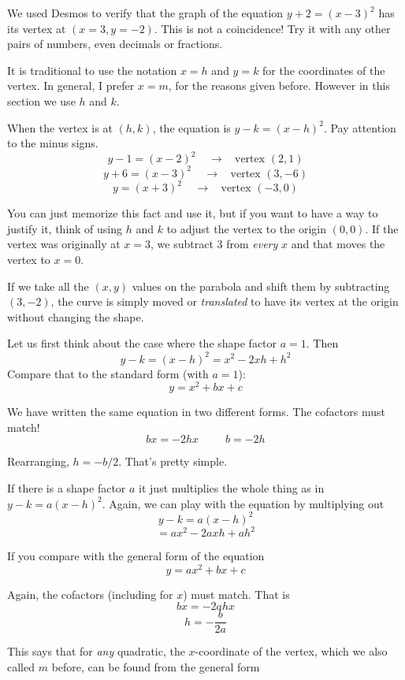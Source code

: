 \documentclass[11pt, oneside]{article}
\begin{document}
We used Desmos to verify that the graph of the equation $y + 2 = (x - 3)^2$ has its vertex at $(x = 3, y = -2)$.  This is not a coincidence!  Try it with any other pairs of numbers, even decimals or fractions.

It is traditional to use the notation $x = h$ and $y = k$ for the coordinates of the vertex.  In general, I prefer $x = m$, for the reasons given before.  However in this section we use $h$ and $k$.

When the vertex is at $(h,k)$, the equation is $y - k = (x - h)^2$.  Pay attention to the minus signs.
\[ y - 1 = (x - 2)^2 \ \ \ \ \ \rightarrow \ \ \ \ \text{vertex } (2,1) \]
\[ y + 6 = (x - 3)^2 \ \ \ \ \ \rightarrow \ \ \ \ \text{vertex } (3,-6) \]
\[ y = (x + 3)^2 \ \ \ \ \ \rightarrow \ \ \ \ \text{vertex } (-3,0) \]

You can just memorize this fact and use it, but if you want to have a way to justify it, think of using $h$ and $k$ to adjust the vertex to the origin $(0,0)$.  If the vertex was originally at $x = 3$, we subtract $3$ from \emph{every} $x$ and that moves the vertex to $x = 0$.

If we take all the $(x,y)$ values on the parabola and shift them by subtracting $(3,-2)$, the curve is simply moved or \emph{translated} to have its vertex at the origin without changing the shape.

Let us first think about the case where the shape factor $a = 1$.  Then
\[ y - k = (x - h)^2 = x^2 - 2xh + h^2 \]
Compare that to the standard form (with $a=1$):
\[ y = x^2 + bx + c \]

We have written the same equation in two different forms.  The cofactors must match!
\[ bx = - 2hx  \ \ \ \ \ \  \ \ \ \ \  b = - 2h \]

Rearranging, $h = -b/2$.  That's pretty simple.

If there is a shape factor $a$ it just multiplies the whole thing as in $y - k = a(x - h)^2$.  Again, we can play with the equation by multiplying out
\[ y - k = a(x - h)^2 \]
\[ = ax^2 - 2axh + ah^2 \]

If you compare with the general form of the equation
\[ y = ax^2 + bx + c \]

Again, the cofactors (including for $x$) must match.  That is
\[ bx = - 2ahx \]
\[ h = - \frac{b}{2a} \]

This says that for \emph{any} quadratic, the $x$-coordinate of the vertex, which we also called $m$ before, can be found from the general form
\end{document}
